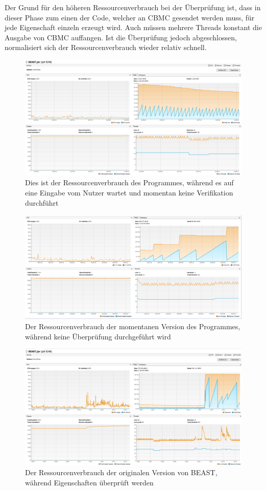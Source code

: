 \documentclass[a4paper]{scrreprt}
\begin{document}
Der Grund für den höheren Ressourcenverbrauch bei der Überprüfung ist, dass in dieser Phase zum einen der Code, welcher an CBMC gesendet
werden muss, für jede Eigenschaft einzeln erzeugt wird. Auch müssen mehrere Threads
konstant die Ausgabe von CBMC auffangen.
Ist die Überprüfung jedoch abgeschlossen, normalisiert sich der
Ressourcenverbrauch wieder relativ schnell.

\newpage
\begin{figure}[ht]
	\centering
  \includegraphics[width=1.0\textwidth,
  height=0.40\textwidth]{images/OLD_NO.png} \caption{Dies ist der
  Ressourcenverbrauch des Programmes, während es auf eine Eingabe vom Nutzer wartet und momentan keine Verifikation durchführt}
	\label{fig1}
\end{figure}

\vspace{4cm}

\begin{figure}[ht]
	\centering
  \includegraphics[width=1.0\textwidth,
  height=0.40\textwidth]{images/NEW_NO.png} \caption{Der Ressourcenverbrauch der
  momentanen Version des Programmes, während keine Überprüfung durchgeführt wird}
	\label{fig2}
\end{figure}


\newpage

\begin{figure}[ht]
	\centering
  \includegraphics[width=1.0\textwidth,
  height=0.4\textwidth]{images/OLD_YES.png} \caption{Der Ressourcenverbrauch
 der originalen Version von BEAST, während Eigenschaften überprüft werden}
	\label{fig3}
\end{figure}
\end{document}
